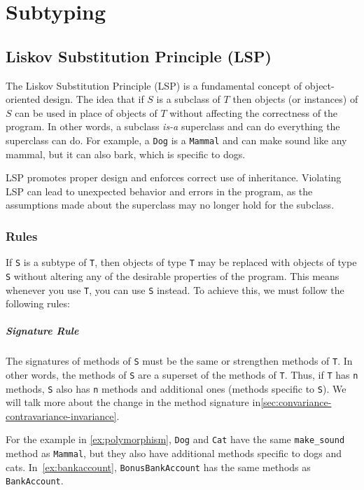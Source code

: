 \documentclass[oneside,11pt,dvipsnames]{book}
\newcommand{\code}[1]{\texttt{#1}}
\begin{document}
\chapter{Subtyping}

\section{Liskov Substitution Principle (LSP)}

The Liskov Substitution Principle (LSP) is a fundamental concept of object-oriented design.  
The idea that if $S$ is a subclass of $T$ then objects (or instances) of $S$ can be used in place of objects of $T$ without affecting the correctness of the program. In other words, a subclass \emph{is-a} superclass and can do everything the superclass can do.
For example, a \code{Dog} is a \code{Mammal} and can make sound like any mammal, but it can also bark, which is specific to dogs.

LSP promotes proper design and enforces correct use of inheritance.
Violating LSP can lead to unexpected behavior and errors in the program, as the assumptions made about the superclass may no longer hold for the subclass. 

\subsection{Rules} 
If \code{S} is a subtype of \code{T}, then objects of type \code{T} may be replaced with objects of type \code{S} without altering any of the desirable properties of the program. This means whenever you use \code{T}, you can use \code{S} instead. To achieve this, we must follow the following rules:

\paragraph{Signature Rule} The signatures of methods of \code{S} must be the same or strengthen methods of \code{T}. In other words, the methods of \code{S} are a superset of the methods of \code{T}. Thus, if \code{T} has \code{n} methods, \code{S} also has \code{n} methods and additional ones (methods specific to \code{S}). We will talk more about the change in the method signature in\autoref{sec:convariance-contravariance-invariance}.

For the example in \autoref{ex:polymorphism}, \code{Dog} and \code{Cat} have the same \code{make\_sound} method as \code{Mammal}, but they also have additional methods specific to dogs and cats.
In~\autoref{ex:bankaccount}, \code{BonusBankAccount} has the same methods as \code{BankAccount}.
\end{document}
